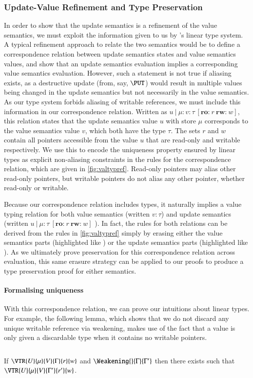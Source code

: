 \documentclass[9pt\ifFinal\else,preprint,nocopyrightspace\fi,\ifAlpha\else natbib,authoryear\fi]{sigplanconf}
\begin{document}
\subsubsection{Update-Value Refinement and Type Preservation}
\label{sec:updvalrel}
In order to show that the update semantics is a refinement of the value semantics, we must exploit the information given to us by \CDSL's linear type system. 
A typical refinement approach to relate the two semantics would be to define a correspondence relation between update semantics states and value semantics values, 
and show that an update semantics evaluation implies a corresponding value semantics evaluation. However, such a statement is not true if aliasing exists, as a destructive
update (from, say, $\PUT$) would result in multiple values being changed in the update semantics but not necessarily in the value semantics. As our type system forbids
aliasing of writable references, we must include this information in our correspondence relation. Written as $u\ |\ \mu : v : \tau\ [\textbf{ro:}\ r\ \textbf{rw:}\ w]$, this relation
states that the update semantics value $u$ with store $\mu$ corresponds to the value semantics value $v$, which both have the type $\tau$. The sets $r$ and $w$ contain
all pointers accessible from the value $u$ that are read-only and writable respectively. We use this to encode the uniqueness property ensured by linear types as explicit
non-aliasing constraints in the rules for the correspondence relation, which are given in \autoref{fig:valtypref}. Read-only pointers may alias other read-only pointers, but
writable pointers do not alias any other pointer, whether read-only or writable. 

Because our correspondence relation includes types, it naturally implies a value typing relation for both value semantics (written $v : \tau$) and update semantics (written
$u\ |\ \mu : \tau\ [\textbf{ro:}\ r\ \textbf{rw:}\ w]$ ). In fact, the rules for both relations can be derived from the rules in \autoref{fig:valtypref} simply by
erasing either the value semantics parts (highlighted like ) or the update semantics parts (highlighted like ). 
As we ultimately prove preservation for this correspondence relation across evaluation, this same erasure strategy can be applied to our proofs to produce a type preservation
proof for either semantics.  

\paragraph{Formalising uniqueness}
With this correspondence relation, we can prove our intuitions about linear types. For example, the following lemma, which shows that we do not discard any unique
writable reference via weakening, makes use of the fact that a value is only given a discardable type when it contains no writable pointers.
\begin{lemma}$\ $ 

\noindent If $\VTR{U}{\mu}{V}{\Gamma}{r}{w}$ and $\Weakening{}{\Gamma}{\Gamma'}$ then there exists  such that 
$\VTR{U}{\mu}{V}{\Gamma'}{r'}{w}$. 
\end{lemma}
\end{document}
